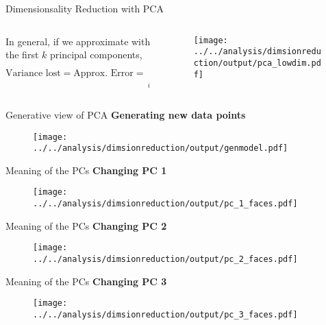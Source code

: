 \documentclass[aspectratio=169]{beamer}
\begin{document}
\begin{frame}[t]{Dimensionsality Reduction with PCA}
  \begin{columns}
    \begin{column}{0.45\textwidth}
      In general, if we approximate with the first $k$ principal components,
      \[ \text{Variance lost} = \text{Approx. Error} = \sum_{i=k+1}^{n} d_{ii} \]
    \end{column}
    \begin{column}{0.5\textwidth}
      \begin{figure}
        \centering
        \texttt{[image: ../../analysis/dimsionreduction/output/pca\_lowdim.pdf]}
      \end{figure}
    \end{column}
  \end{columns}
\end{frame}


\begin{frame}[t]{Generative view of PCA}
  \textbf{Generating new data points}
  \begin{figure}
    \centering
    \texttt{[image: ../../analysis/dimsionreduction/output/genmodel.pdf]}
  \end{figure}
\end{frame}


\begin{frame}[t]{Meaning of the PCs}
  \textbf{Changing PC 1}
  \begin{figure}
    \centering
    \texttt{[image: ../../analysis/dimsionreduction/output/pc\_1\_faces.pdf]}
  \end{figure}
\end{frame}


\begin{frame}[t]{Meaning of the PCs}
  \textbf{Changing PC 2}
  \begin{figure}
    \centering
    \texttt{[image: ../../analysis/dimsionreduction/output/pc\_2\_faces.pdf]}
  \end{figure}
\end{frame}


\begin{frame}[t]{Meaning of the PCs}
  \textbf{Changing PC 3}
  \begin{figure}
    \centering
    \texttt{[image: ../../analysis/dimsionreduction/output/pc\_3\_faces.pdf]}
  \end{figure}
\end{frame}
\end{document}
